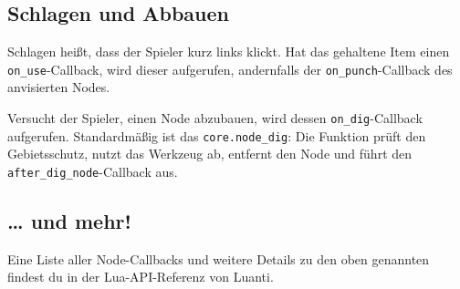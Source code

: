 \subsection{Schlagen und Abbauen}\label{schlagen-und-abbauen}

Schlagen heißt, dass der Spieler kurz links klickt. Hat das gehaltene
Item einen \texttt{on\_\allowbreak{}use}-Callback, wird dieser
aufgerufen, andernfalls der \texttt{on\_\allowbreak{}punch}-Callback des
anvisierten Nodes.

Versucht der Spieler, einen Node abzubauen, wird dessen
\texttt{on\_\allowbreak{}dig}-Callback
aufgerufen. Standardmäßig ist das
\texttt{core.\allowbreak{}node\_\allowbreak{}dig}: Die Funktion prüft
den Gebietsschutz, nutzt das Werkzeug ab, entfernt den Node und führt
den
\texttt{after\_\allowbreak{}dig\_\allowbreak{}node}-Callback
aus.

\begin{Shaded}
\begin{Highlighting}[]
\OperatorTok{(}\OperatorTok{,} \OperatorTok{\{}
     \OperatorTok{=} \OperatorTok{(}\OperatorTok{,} \OperatorTok{,} \OperatorTok{,} \OperatorTok{)}
         \OperatorTok{:}\OperatorTok{()} 
            \OperatorTok{(}
                \OperatorTok{:}\OperatorTok{(),}
            \OperatorTok{)}
    \OperatorTok{,}
\OperatorTok{\})}
\end{Highlighting}
\end{Shaded}

\subsection{\ldots{} und mehr!}\label{und-mehr}

Eine Liste aller Node-Callbacks und weitere Details zu den oben
genannten findest du in der Lua-API-Referenz von Luanti.
